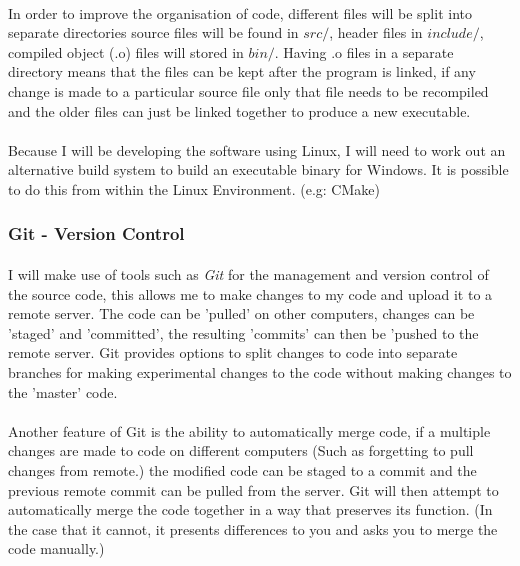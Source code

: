 \paragraph{}
In order to improve the organisation of code, different files will be split into separate directories source files will be found in $src/$, header files in $include/$, compiled object (.o) files will stored in $bin/$.
Having .o files in a separate directory means that the files can be kept after the program is linked, if any change is made to a particular source file only that file needs to be recompiled and the older files can just be linked together to produce a new executable.

\paragraph{}
Because I will be developing the software using Linux, I will need to work out an alternative build system to build an executable binary for Windows. It is possible to do this from within the Linux Environment. (e.g: CMake)

\subsubsection{Git - Version Control}
\paragraph{}
I will make use of tools such as \textit{Git} for the management and version control of the source code, this allows me to make changes to my code and upload it to a remote server. The code can be 'pulled' on other computers, changes can be 'staged' and 'committed', the resulting 'commits' can then be 'pushed to the remote server. Git provides options to split changes to code into separate branches for making experimental changes to the code without making changes to the 'master' code.

\paragraph{}
Another feature of Git is the ability to automatically merge code, if a multiple changes are made to code on different computers (Such as forgetting to pull changes from remote.) the modified code can be staged to a commit and the previous remote commit can be pulled from the server. Git will then attempt to automatically merge the code together in a way that preserves its function. (In the case that it cannot, it presents differences to you and asks you to merge the code manually.)

